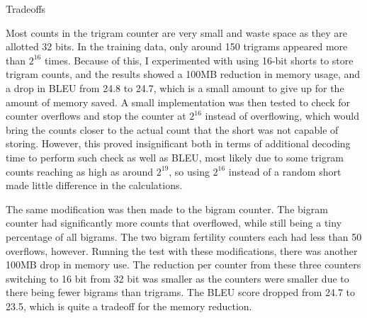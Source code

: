 

Tradeoffs

Most counts in the trigram counter are very small and waste space as they are allotted 32 bits. In the training data, only around 150 trigrams appeared more than $2^16$ times. Because of this, I experimented with using 16-bit shorts to store trigram counts, and the results showed a 100MB reduction in memory usage, and a drop in BLEU from 24.8 to 24.7, which is a small amount to give up for the amount of memory saved. A small implementation was then tested to check for counter overflows and stop the counter at $2^16$ instead of overflowing, which would bring the counts closer to the actual count that the short was not capable of storing. However, this proved insignificant both in terms of additional decoding time to perform such check as well as BLEU, most likely due to some trigram counts reaching as high as around $2^19$, so using $2^16$ instead of a random short made little difference in the calculations.

The same modification was then made to the bigram counter. The bigram counter had significantly more counts that overflowed, while still being a tiny percentage of all bigrams. The two bigram fertility counters each had less than 50 overflows, however. Running the test with these modifications, there was another 100MB drop in memory use. The reduction per counter from these three counters switching to 16 bit from 32 bit was smaller as the counters were smaller due to there being fewer bigrams than trigrams. The BLEU score dropped from 24.7 to 23.5, which is quite a tradeoff for the memory reduction.


